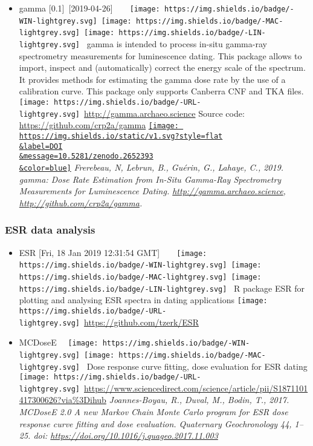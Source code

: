 \documentclass[]{article}
\providecommand{\tightlist}{%
  \setlength{\itemsep}{0pt}\setlength{\parskip}{0pt}}
\begin{document}
\begin{itemize}
\tightlist
\item
  gamma {[}0.1{]}~{[}2019-04-26{]}~~~~\texttt{[image: https://img.shields.io/badge/-WIN-lightgrey.svg]}~\texttt{[image: https://img.shields.io/badge/-MAC-lightgrey.svg]}~\texttt{[image: https://img.shields.io/badge/-LIN-lightgrey.svg]}~
  gamma is intended to process in-situ gamma-ray spectrometry measurements for luminescence dating. This package allows to import, inspect and (automatically) correct the energy scale of the spectrum. It provides methods for estimating the gamma dose rate by the use of a calibration curve. This package only supports Canberra CNF and TKA files.
  \texttt{[image: https://img.shields.io/badge/-URL-lightgrey.svg]}~\url{http://gamma.archaeo.science}
  \textbar{} Source code: \url{https://github.com/crp2a/gamma}
  \href{https://doi.org/10.5281/zenodo.2652393}{\texttt{[image: https://img.shields.io/static/v1.svg?style=flat\\\&label=DOI\\\&message=10.5281/zenodo.2652393\\\&color=blue]}}
  \emph{Frerebeau, N, Lebrun, B., Guérin, G., Lahaye, C., 2019. gamma: Dose Rate Estimation from In-Situ Gamma-Ray Spectrometry Measurements for Luminescence Dating. \url{http://gamma.archaeo.science}, \url{http://github.com/crp2a/gamma}.}
\end{itemize}

\hypertarget{esr-data-analysis}{%
\subsubsection{ESR data analysis}\label{esr-data-analysis}}

\begin{itemize}
\tightlist
\item
  ESR {[}Fri, 18 Jan 2019 12:31:54 GMT{]}~~~~\texttt{[image: https://img.shields.io/badge/-WIN-lightgrey.svg]}~\texttt{[image: https://img.shields.io/badge/-MAC-lightgrey.svg]}~\texttt{[image: https://img.shields.io/badge/-LIN-lightgrey.svg]}~
  R package ESR for plotting and analysing ESR spectra in dating applications
  \texttt{[image: https://img.shields.io/badge/-URL-lightgrey.svg]}~\url{https://github.com/tzerk/ESR}
\item
  MCDoseE ~~\texttt{[image: https://img.shields.io/badge/-WIN-lightgrey.svg]}~\texttt{[image: https://img.shields.io/badge/-MAC-lightgrey.svg]}~
  Dose response curve fitting, dose evaluation for ESR dating
  \texttt{[image: https://img.shields.io/badge/-URL-lightgrey.svg]}~\url{https://www.sciencedirect.com/science/article/pii/S1871101417300626?via\%3Dihub}
  \emph{Joannes-Boyau, R., Duval, M., Bodin, T., 2017. MCDoseE 2.0 A new Markov Chain Monte Carlo program for ESR dose response curve fitting and dose evaluation. Quaternary Geochronology 44, 1--25. doi: \url{https://doi.org/10.1016/j.quageo.2017.11.003}}
\end{itemize}
\end{document}

